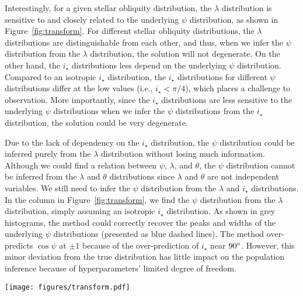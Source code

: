 \documentclass[twocolumn,times]{aastex631}
\begin{document}
Interestingly, for a given stellar obliquity distribution, the $\lambda$ distribution is sensitive to and closely related to the underlying $\psi$ distribution, as shown in Figure~\ref{fig:transform}. For different stellar obliquity distributions, the $\lambda$ distributions are distinguishable from each other, and thus, when we infer the $\psi$ distribution from the $\lambda$ distribution, the solution will not degenerate.
On the other hand, the $i_\star$ distributions less depend on the underlying $\psi$ distribution. Compared to an isotropic $i_\star$ distribution, the $i_\star$ distributions for different $\psi$ distributions differ at the low values (i.e., $i_\star < \pi/4$), which places a challenge to observation. More importantly, since the $i_\star$ distributions are less sensitive to the underlying $\psi$ distributions when we infer the $\psi$ distributions from the $i_\star$ distribution, the solution could be very degenerate.

Due to the lack of dependency on the $i_\star$ distribution, the $\psi$ distribution could be inferred purely from the $\lambda$ distribution without losing much information. Although we could find a relation between $\psi$, $\lambda$, and $\theta$, the $\psi$ distribution cannot be inferred from the $\lambda$ and $\theta$ distributions since $\lambda$ and $\theta$ are not independent variables. We still need to infer the $\psi$ distribution from the $\lambda$ and $i_\star$ distributions.
In the  column in Figure~\ref{fig:transform}, we find the $\psi$ distribution from the $\lambda$ distribution, simply assuming an isotropic $i_\star$ distribution. As shown in grey histograms, the method could correctly recover the peaks and widths of the underlying $\psi$ distributions (presented as blue dashed lines). The method over-predicts $\cos{\psi}$ at $\pm 1$ because of the over-prediction of $i_\star$ near $90\mbox{$^\circ$}$. However, this minor deviation from the true distribution has little impact on the population inference because of hyperparameters' limited degree of freedom.

\begin{figure*}[ht!]
    \texttt{[image: figures/transform.pdf]}
    \caption{Simulated $\cos{\psi}$ distributions ( column) and their corresponding sky-projected stellar obliquity $\lambda$ ( column) and stellar inclination $i_\star$ ( column) distributions. The inferred $\cos{\psi}$ distributions assuming isotropic stellar inclinations are shown in the  column. The random samplings of $\lambda$ and $i_\star$ out of the $\cos{\psi}$ distributions are shown as grey histograms, and the numerical solutions are shown as blue curves.}
    \label{fig:transform}
\end{figure*}
\end{document}
